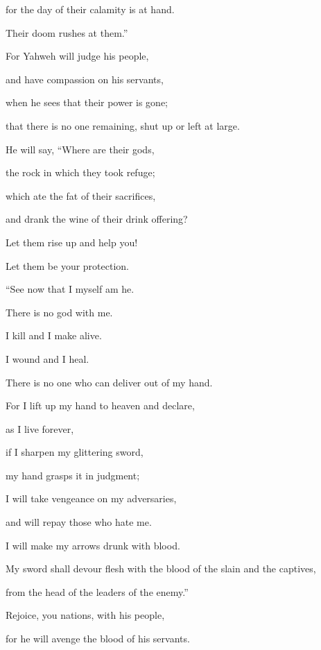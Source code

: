 {\par }{\Q for the day of their calamity is at hand.
\par }{\QB Their doom rushes at them.”
\par }{\BB \par }{\Q {}For Yahweh will judge his people,
\par }{\QB and have compassion on his servants,
\par }{\Q when he sees that their power is gone;
\par }{\QB that there is no one remaining, shut up or left at large.
\par }{\Q {}He will say, “Where are their gods,
\par }{\QB the rock in which they took refuge;
\par }{\Q {}which ate the fat of their sacrifices,
\par }{\QB and drank the wine of their drink offering?
\par }{\Q Let them rise up and help you!
\par }{\QB Let them be your protection.
\par }{\BB \par }{\Q {}“See now that I myself am he.
\par }{\QB There is no god with me.
\par }{\Q I kill and I make alive.
\par }{\QB I wound and I heal.
\par }{\QB There is no one who can deliver out of my hand.
\par }{\Q {}For I lift up my hand to heaven and declare,
\par }{\QB as I live forever,
\par }{\Q {}if I sharpen my glittering sword,
\par }{\QB my hand grasps it in judgment;
\par }{\Q I will take vengeance on my adversaries,
\par }{\QB and will repay those who hate me.
\par }{\Q {}I will make my arrows drunk with blood.
\par }{\QB My sword shall devour flesh with the blood of the slain and the captives,
\par }{\QB from the head of the leaders of the enemy.”
\par }{\BB \par }{\Q {}Rejoice, you nations, with his people,
\par }{\QB for he will avenge the blood of his servants.
}
